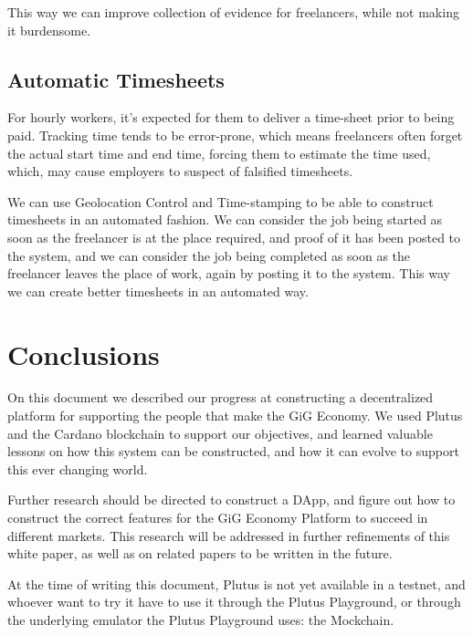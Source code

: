 \documentclass{article}
\begin{document}
This way we can improve collection of evidence for freelancers, while not making it burdensome.

\subsection{Automatic Timesheets}

For hourly workers, it's expected for them to deliver a time-sheet prior to being paid. Tracking time tends to be error-prone, which means freelancers often forget the actual start time and end time, forcing them to estimate the time used, which, may cause employers to suspect of falsified timesheets.

We can use Geolocation Control and Time-stamping to be able to construct timesheets in an automated fashion. We can consider the job being started as soon as the freelancer is at the place required, and proof of it has been posted to the system, and we can consider the job being completed as soon as the freelancer leaves the place of work, again by posting it to the system. This way we can create better timesheets in an automated way.

\section{Conclusions}

On this document we described our progress at constructing a decentralized platform for supporting the people that make the GiG Economy. We used Plutus and the Cardano blockchain to support our objectives, and learned valuable lessons on how this system can be constructed, and how it can evolve to support this ever changing world.

Further research should be directed to construct a DApp, and figure out how to construct the correct features for the GiG Economy Platform to succeed in different markets. This research will be addressed in further refinements of this white paper, as well as on related papers to be written in the future.



At the time of writing this document, Plutus is not yet available in a testnet, and whoever want to try it have to use it through the Plutus Playground, or through the underlying emulator the Plutus Playground uses: the Mockchain.
\end{document}
